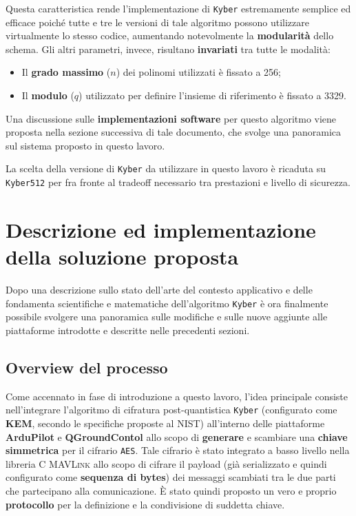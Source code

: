 \documentclass[a4paper, 12pt, oneside]{article}
\theoremstyle{definition}
\begin{document}
Questa caratteristica rende l'implementazione di \texttt{Kyber} estremamente semplice ed efficace poiché tutte e tre le versioni di tale algoritmo possono utilizzare virtualmente lo stesso codice, aumentando notevolmente la \textbf{modularità} dello schema.
\newpage
Gli altri parametri, invece, risultano \textbf{invariati} tra tutte le modalità:

\begin{itemize}
    \item Il \textbf{grado massimo} ($n$) dei polinomi utilizzati è fissato a 256;
    \item Il \textbf{modulo} ($q$) utilizzato per definire l'insieme di riferimento è fissato a 3329.
\end{itemize}

Una discussione sulle \textbf{implementazioni software} per questo algoritmo viene proposta nella sezione successiva di tale documento, che svolge una panoramica sul sistema proposto in questo lavoro.

La scelta della versione di \texttt{Kyber} da utilizzare in questo lavoro è ricaduta su \texttt{Kyber512} per fra fronte al tradeoff necessario tra prestazioni e livello di sicurezza.

\newpage
\section{Descrizione ed implementazione della soluzione proposta}
Dopo una descrizione sullo stato dell'arte del contesto applicativo e delle fondamenta scientifiche e matematiche dell'algoritmo \texttt{Kyber} è ora finalmente possibile svolgere una panoramica sulle modifiche e sulle nuove aggiunte alle piattaforme introdotte e descritte nelle precedenti sezioni.

\subsection{Overview del processo}
Come accennato in fase di introduzione a questo lavoro, l'idea principale consiste nell'integrare l'algoritmo di cifratura post-quantistica \texttt{Kyber} (configurato come \textbf{KEM}, secondo le specifiche proposte al NIST) all'interno delle piattaforme \textbf{ArduPilot} e \textbf{QGroundContol} allo scopo di \textbf{generare} e scambiare una \textbf{chiave simmetrica} per il cifrario \texttt{AES}. Tale cifrario è stato integrato a basso livello nella libreria C \textsc{MAVLink} allo scopo di cifrare il payload (già serializzato e quindi configurato come \textbf{sequenza di bytes}) dei messaggi scambiati tra le due parti che partecipano alla comunicazione. È stato quindi proposto un vero e proprio \textbf{protocollo} per la definizione e la condivisione di suddetta chiave.
\end{document}
